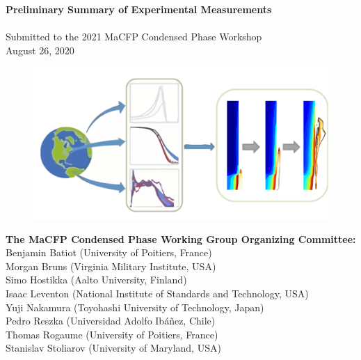 \documentclass{book}
\begin{document}
\pagestyle{empty}

\vspace*{2in}

\begin{center}
{\bf Preliminary Summary of Experimental Measurements} \\
\hspace{1in} \\
Submitted to the 2021 MaCFP Condensed Phase Workshop \\
August 26, 2020 \\
\end{center}

\begin{figure}
  \centering
  \includegraphics[width=6in]{FIGURES/MaCFP_Logo}
  \label{Cover_Image}
\end{figure}

\vfill

\begin{flushright}
{\bf The MaCFP Condensed Phase Working Group Organizing Committee:} \\
Benjamin Batiot (University of Poitiers, France) \\
Morgan Bruns (Virginia Military Institute, USA) \\
Simo Hostikka (Aalto University, Finland) \\
Isaac Leventon (National Institute of Standards and Technology, USA) \\
Yuji Nakamura (Toyohashi University of Technology, Japan) \\
Pedro Reszka (Universidad Adolfo Ibáñez, Chile) \\
Thomas Rogaume (University of Poitiers, France) \\
Stanislav Stoliarov (University of Maryland, USA)
\end{flushright}

\newpage
\end{document}
